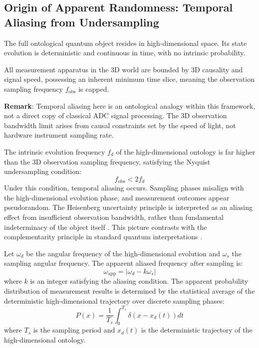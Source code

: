 \documentclass[12pt,a4paper]{article}
\begin{document}
\subsection{Origin of Apparent Randomness: Temporal Aliasing from Undersampling}
The full ontological quantum object resides in high-dimensional space. Its state evolution is deterministic and continuous in time, with no intrinsic probability.

All measurement apparatus in the 3D world are bounded by 3D causality and signal speed, possessing an inherent minimum time slice, meaning the observation sampling frequency $f_{\text{obs}}$ is capped.

\textbf{Remark}: Temporal aliasing here is an ontological analogy within this framework, not a direct copy of classical ADC signal processing. The 3D observation bandwidth limit arises from causal constraints set by the speed of light, not hardware instrument sampling rate.

The intrinsic evolution frequency $f_d$ of the high-dimensional ontology is far higher than the 3D observation sampling frequency, satisfying the Nyquist undersampling condition:
\begin{equation}
f_{\text{obs}} < 2 f_d
\end{equation}
Under this condition, temporal aliasing occurs. Sampling phases misalign with the high-dimensional evolution phase, and measurement outcomes appear pseudorandom. The Heisenberg uncertainty principle is interpreted as an aliasing effect from insufficient observation bandwidth, rather than fundamental indeterminacy of the object itself \cite{shannon1949}. This picture contrasts with the complementarity principle in standard quantum interpretations \cite{zeilinger2000}.

Let $\omega_d$ be the angular frequency of the high-dimensional evolution and $\omega_s$ the sampling angular frequency. The apparent aliased frequency after sampling is:
\begin{equation}
\omega_{\text{app}} = |\omega_d - k\omega_s|
\end{equation}
where $k$ is an integer satisfying the aliasing condition. The apparent probability distribution of measurement results is determined by the statistical average of the deterministic high-dimensional trajectory over discrete sampling phases:
\begin{equation}
P(x) = \frac{1}{T_s} \int_0^{T_s} \delta(x - x_d(t)) dt
\end{equation}
where $T_s$ is the sampling period and $x_d(t)$ is the deterministic trajectory of the high-dimensional ontology.
\end{document}
